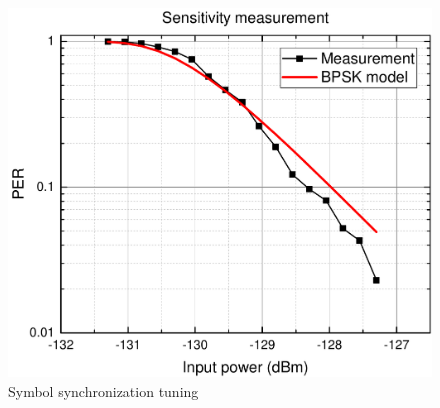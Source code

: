 \begin{figure}
    \centering
    \includegraphics[width=0.6\paperwidth]{img/7/sensitivityG.pdf}
    \caption{Symbol synchronization tuning}
    \label{sensitivity_test_model}
\end{figure}